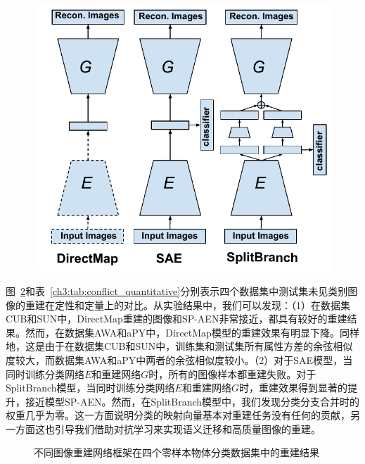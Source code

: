 \begin{figure}
    \centering
        \includegraphics[width=0.95\linewidth]{chapter3/res/conflict.pdf}
    \label{ch3:fig:conflict}
\end{figure}

图~\ref{ch3:fig:conflict_visualization}和表~\ref{ch3:tab:conflict_quantitative}分别表示四个数据集中测试集未见类别图像的重建在定性和定量上的对比。从实验结果中，我们可以发现：（1）在数据集CUB和SUN中，DirectMap重建的图像和SP-AEN非常接近，都具有较好的重建结果。然而，在数据集AWA和aPY中，DirectMap模型的重建效果有明显下降。同样地，这是由于在数据集CUB和SUN中，训练集和测试集所有属性方差的余弦相似度较大，而数据集AWA和aPY中两者的余弦相似度较小。（2）对于SAE模型，当同时训练分类网络$E$和重建网络$G$时，所有的图像样本都重建失败。对于SplitBranch模型，当同时训练分类网络$E$和重建网络$G$时，重建效果得到显著的提升，接近模型SP-AEN。然而，在SplitBranch模型中，我们发现分类分支合并时的权重几乎为零。这一方面说明分类的映射向量基本对重建任务没有任何的贡献，另一方面这也引导我们借助对抗学习来实现语义迁移和高质量图像的重建。

\begin{figure}[t]
    \centering
    \caption{不同图像重建网络框架在四个零样本物体分类数据集中的重建结果}
    \label{ch3:fig:conflict_visualization}
\end{figure}

